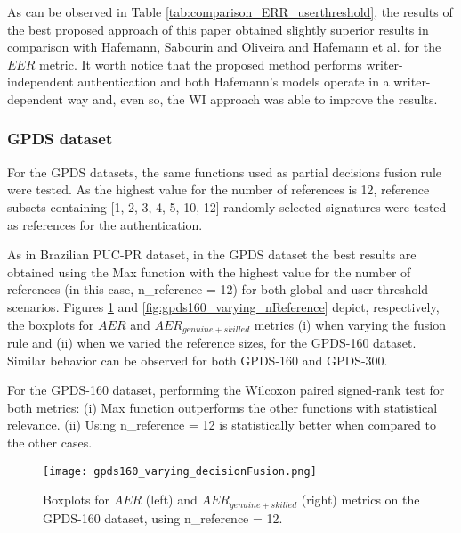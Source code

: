 \documentclass[conference]{IEEEtran}
\begin{document}
As can be observed in Table \ref{tab:comparison_ERR_userthreshold}, the results of the best proposed approach of this paper obtained slightly superior results in comparison with Hafemann, Sabourin and Oliveira \cite{hafemann:16} and Hafemann et al. \cite{hafemann:17} for the $EER$ metric. It worth notice that the proposed method performs writer-independent authentication and both Hafemann's models operate in a writer-dependent way and, even so, the WI approach was able to improve the results.


\subsubsection{GPDS dataset}
For the GPDS datasets, the same functions used as partial decisions fusion rule were tested. As the highest value for the number of references is 12, reference subsets containing [1, 2, 3, 4, 5, 10, 12] randomly selected signatures were tested as references for the authentication.

As in Brazilian PUC-PR dataset, in the GPDS dataset the best results are obtained using the Max function with the highest value for the number of references (in this case, n\_reference = 12) for both global and user threshold scenarios.  
Figures \ref{fig:gpds160_varying_decisionFusion} and \ref{fig:gpds160_varying_nReference} depict, respectively, the boxplots for $AER$ and $AER_{genuine+skilled}$ metrics (i) when varying the fusion rule and (ii) when we varied the reference sizes, for the GPDS-160 dataset. Similar behavior can be observed for both GPDS-160 and GPDS-300.

For the GPDS-160 dataset, performing the Wilcoxon paired signed-rank test for both metrics: (i) Max function outperforms
the other functions with statistical relevance. (ii) Using n\_reference = 12 is statistically better when compared to the other cases.

\begin{figure}[!htb]
\centering
  \texttt{[image: gpds160\_varying\_decisionFusion.png]}
  \caption{Boxplots for $AER$ (left) and $AER_{genuine+skilled}$ (right) metrics on the GPDS-160 dataset, using n\_reference = 12.}
  \label{fig:gpds160_varying_decisionFusion}
\end{figure}
\end{document}
